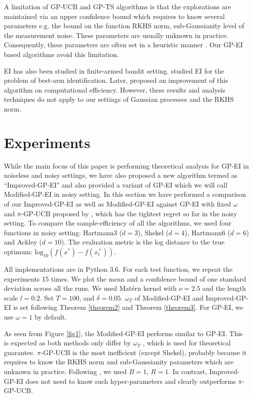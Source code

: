 \documentclass[twoside]{article}
\begin{document}
A limitation of GP-UCB and GP-TS algorithms is that the explorations are maintained via an upper confidence bound which requires to know several parameters e.g. the bound on the function RKHS norm, sub-Gaussianity level of the measurement noise. These parameters are usually unknown in practice. Consequently, these parameters are often set in a heuristic manner \citep{Berkenkamp17,Bogunovic18,janz20a,Wachi20}. Our GP-EI based algorithms avoid this limitation.

EI has also been studied in finite-armed bandit setting. \citet{Ryzhov16} studied EI for the problem of best-arm identification. Later, \citet{Qin17} proposed an improvement of this algorithm on computational efficiency. However, these results and analysis techniques do not apply to our settings of Gaussian processes and the RKHS norm.
\section{Experiments}
While the main focus of this paper is performing theoretical analysis for GP-EI in noiseless and noisy settings, we have also proposed a new algorithm termed as ``Improved-GP-EI" and also provided a variant of GP-EI which we will call Modified-GP-EI in noisy setting. In this section we have performed a comparison of our Improved-GP-EI as well as Modified-GP-EI against GP-EI with fixed $\omega$ and $\pi$-GP-UCB proposed by \citet{janz20a}, which has the tightest regret so far in the noisy setting. To compare the sample-efficiency of all the algorithms, we used four functions in noisy setting: Hartmann3 ($d =3$), Shekel ($d =4$), Hartmann6 ($d =6$) and Ackley ($d =10$). The evaluation metric is the log distance to the true optimum: $\text{log}_{10}(f(x^*) - f(x^+_t))$.

All implementations are in Python 3.6. For each test function, we repeat the experiments 15 times. We plot the mean and a confidence bound of one standard deviation across all the runs. We used Mat\'ern kernel with $\nu =2.5$ and the length scale $l =0.2$. Set $T = 100$, and $\delta = 0.05$. $\omega_T$ of Modified-GP-EI and Improved-GP-EI is set following Theorem \ref{theorem2} and Theorem \ref{theorem3}. For GP-EI, we use $\omega =1$ by default.

As seen from Figure \ref{fig1}, the Modified-GP-EI performs similar to GP-EI. This is expected as both methods only differ by $\omega_T$ , which is used for theoretical guarantee. $\pi$-GP-UCB is the most inefficient (except Shekel), probably because it requires to know the RKHS norm and sub-Gaussianity parameters which are unknown in practice. Following \citep{janz20a}, we used $B =1$, $R =1$. In contrast, Improved-GP-EI does not need to know such hyper-parameters and clearly outperforms $\pi$-GP-UCB.
\end{document}

